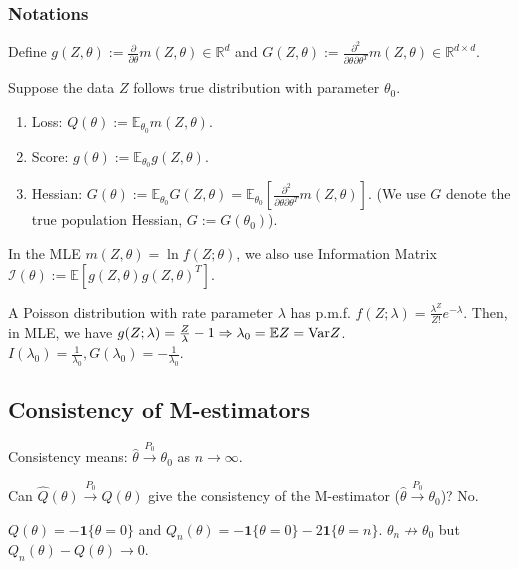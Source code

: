 \documentclass[11pt]{elegantbook}
\begin{document}
\subsubsection*{Notations}
Define $g(Z,\theta):=\frac{\partial}{\partial \theta}m(Z,\theta)\in \mathbb{R}^d$ and $G(Z,\theta):=\frac{\partial^2}{\partial \theta\partial \theta^T}m(Z,\theta)\in \mathbb{R}^{d\times d}$.
\begin{definition}
\normalfont
Suppose the data $Z$ follows true distribution with parameter $\theta_0$.
\begin{enumerate}
    \item Loss: $Q(\theta):=\mathbb{E}_{\theta_0}m(Z,\theta)$.
    \item Score: $g(\theta):=\mathbb{E}_{\theta_0}g(Z,\theta)$.
    \item Hessian: $G(\theta):=\mathbb{E}_{\theta_0}G(Z,\theta)= \mathbb{E}_{\theta_0}\left[\frac{\partial^2}{\partial \theta\partial \theta^T}m(Z,\theta)\right]$. (We use $G$ denote the true population Hessian, $G:=G(\theta_0)$).
\end{enumerate}
\end{definition}
In the MLE $m(Z,\theta)=\ln f(Z;\theta)$, we also use Information Matrix $\mathcal{I}(\theta):=\mathbb{E}[g(Z,\theta)g(Z,\theta)^T]$.
\begin{example}
    A Poisson distribution with rate parameter $\lambda$ has p.m.f. $f(Z;\lambda)=\frac{\lambda^Z}{Z!}e^{-\lambda}$. Then, in MLE, we have $g(Z;\lambda)=\frac{Z}{\lambda}-1 \Rightarrow \lambda_0=\mathbb{E}Z=\textnormal{Var}Z$. $I(\lambda_0)=\frac{1}{\lambda_0}, G(\lambda_0)=-\frac{1}{\lambda_0}$.
\end{example}



\subsection{Consistency of M-estimators}
Consistency means: $\hat{\theta} \stackrel{P_0}{\longrightarrow} \theta_0$ as $n \rightarrow \infty$.

Can $\hat{Q}(\theta)\stackrel{P_0}{\longrightarrow} Q(\theta)$ give the consistency of the M-estimator ($\hat{\theta} \stackrel{P_0}{\longrightarrow} \theta_0$)? No.
\begin{example}
    $Q(\theta)=-\mathbf{1}\{\theta=0\}$ and $Q_n(\theta)=-\mathbf{1}\{\theta=0\}-2\mathbf{1}\{\theta=n\}$. $\theta_n \nrightarrow \theta_0$ but $Q_n(\theta)-Q(\theta) \rightarrow 0$.
\end{example}
\end{document}
